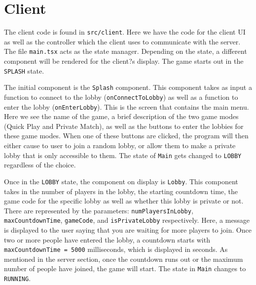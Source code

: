 \documentclass[12pt]{report}
\begin{document}
\section{Client}

The client code is found in \texttt{src/client}. Here we have the code for the client UI as well as the controller which the client uses to communicate with the server. The file \texttt{main.tsx} acts as the state manager. Depending on the state, a different component will be rendered for the client?s display. The game starts out in the \texttt{SPLASH} state.


The initial component is the \texttt{Splash} component. This component takes as input a function to connect to the lobby (\texttt{onConnectToLobby}) as well as a function to enter the lobby (\texttt{onEnterLobby}). This is the screen that contains the main menu. Here we see the name of the game, a brief description of the two game modes (Quick Play and Private Match), as well as the buttons to enter the lobbies for these game modes. When one of these buttons are clicked, the program will then either cause to user to join a random lobby, or allow them to make a private lobby that is only accessible to them. The state of \texttt{Main} gets changed to \texttt{LOBBY} regardless of the choice.


Once in the \texttt{LOBBY} state, the component on display is \texttt{Lobby}. This component takes in the number of players in the lobby, the starting countdown time, the game code for the specific lobby as well as whether this lobby is private or not. There are represented by the parameters: \texttt{numPlayersInLobby}, \texttt{maxCountdownTime}, \texttt{gameCode}, and \texttt{isPrivateLobby} respectively. Here, a message is displayed to the user saying that you are waiting for more players to join. Once two or more people have entered the lobby, a countdown starts with \texttt{maxCountdownTime = 5000} milliseconds, which is displayed in seconds. As mentioned in the server section, once the countdown runs out or the maximum number of people have joined, the game will start. The state in \texttt{Main} changes to \texttt{RUNNING}.
\end{document}
